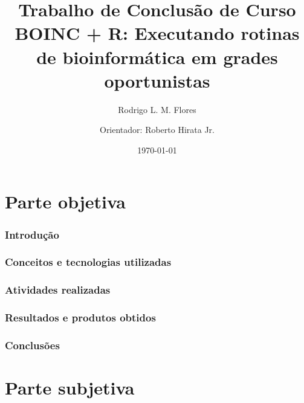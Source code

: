 \documentclass[a4paper,12pt,titlepage]{article}
\title{Trabalho de Conclusão de Curso \\ 
BOINC + R: Executando rotinas de bioinformática em grades oportunistas}
\author{Rodrigo L. M. Flores \and
        Orientador: Roberto Hirata Jr. }
\date{\today}
\begin{document}
\maketitle

\tableofcontents

\nocite{wiki:volunteercomputing}
\nocite{wiki:interpretedlanguage}
\nocite{wiki:boinc}
\nocite{wiki:r}
\nocite{boinc_wrapper}
\nocite{hungaro}
\nocite{nytimes}

\part{Parte objetiva}

\section{Introdução}



\newpage

\section{Conceitos e tecnologias utilizadas}



\newpage

\section{Atividades realizadas}



\newpage

\section{Resultados e produtos obtidos}




\newpage

\section{Conclusões}



\newpage





\newpage


\part{Parte subjetiva}


\end{document}
